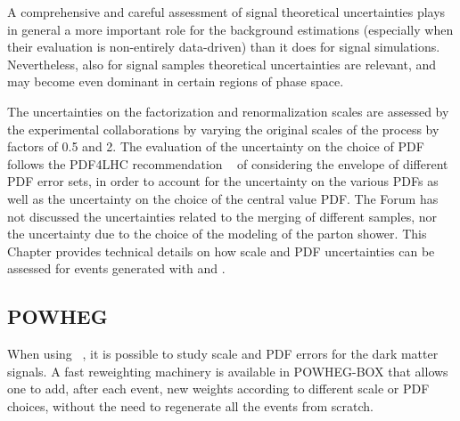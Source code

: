 
A comprehensive and careful assessment of signal theoretical uncertainties
plays in general a more important role for the background estimations
(especially when their evaluation is non-entirely data-driven) than it
does for signal simulations. Nevertheless, also for signal samples theoretical 
uncertainties are relevant, and may become even dominant in certain regions of phase space.

The uncertainties on the factorization and renormalization scales are assessed by the experimental collaborations by varying
the original scales of the process by factors of 0.5 and 2. The evaluation of the uncertainty on the choice of PDF follows
the PDF4LHC recommendation ~\cite{PDF4LHC} of considering the envelope of different PDF error sets, in order to account
for the uncertainty on the various PDFs as well as the uncertainty on the choice of the central value PDF. 
The Forum has not discussed the uncertainties related to the merging of different samples, nor the uncertainty
due to the choice of the modeling of the parton shower.  
This Chapter provides technical details on how scale and PDF uncertainties can be assessed 
for events generated with \powheg and \madgraph.

\subsection{POWHEG}

When using \powheg~\cite{Frixione:2007vw,Alioli:2010xd,Nason:2004rx}, it is
possible to study scale and PDF errors for the dark matter signals. A
fast reweighting machinery is available in \textsc{POWHEG-BOX} that
allows one to add, after each event, new weights according to
different scale or PDF choices, without the need to regenerate all the
events from scratch. 

